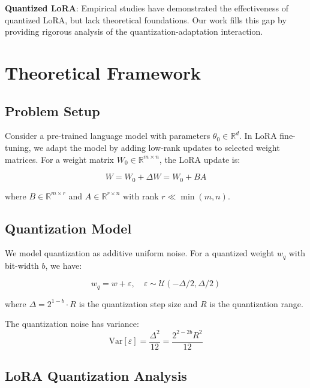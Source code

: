 \documentclass[10pt,twocolumn]{article}
\newcommand{\R}{\mathbb{R}}
\newcommand{\Var}{\text{Var}}
\begin{document}
\textbf{Quantized LoRA}: Empirical studies \citep{dettmers2023qlora, xu2023qr-adaptor} have demonstrated the effectiveness of quantized LoRA, but lack theoretical foundations. Our work fills this gap by providing rigorous analysis of the quantization-adaptation interaction.

\section{Theoretical Framework}

\subsection{Problem Setup}

Consider a pre-trained language model with parameters $\theta_0 \in \R^d$. In LoRA fine-tuning, we adapt the model by adding low-rank updates to selected weight matrices. For a weight matrix $W_0 \in \R^{m \times n}$, the LoRA update is:

\begin{equation}
W = W_0 + \Delta W = W_0 + BA
\end{equation}

where $B \in \R^{m \times r}$ and $A \in \R^{r \times n}$ with rank $r \ll \min(m,n)$.

\subsection{Quantization Model}

We model quantization as additive uniform noise. For a quantized weight $w_q$ with bit-width $b$, we have:

\begin{equation}
w_q = w + \varepsilon, \quad \varepsilon \sim \mathcal{U}(-\Delta/2, \Delta/2)
\end{equation}

where $\Delta = 2^{1-b} \cdot R$ is the quantization step size and $R$ is the quantization range.

The quantization noise has variance:
\begin{equation}
\Var[\varepsilon] = \frac{\Delta^2}{12} = \frac{2^{2-2b} R^2}{12}
\end{equation}

\subsection{LoRA Quantization Analysis}
\end{document}
